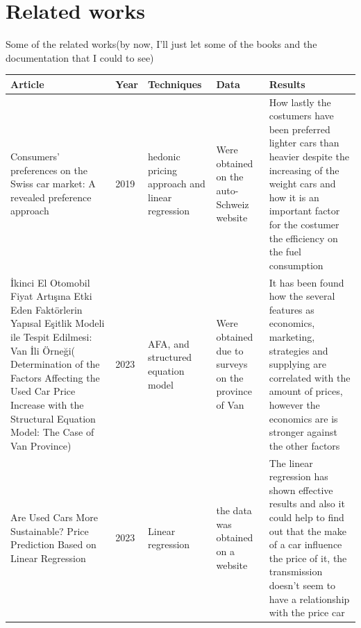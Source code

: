 \documentclass{article}
\begin{document}
\section{Related works}
Some of the related works(by now, I'll just let some of the books and the documentation that I could  to see)
\begin{center}
  \begin{tabular}{|m{2.5cm}|m{2.5cm}|m{2.5cm}|m{2.5cm}|m{2.5cm}|}
    \hline
    Article & Year & Techniques & Data & Results \\ \hline
    Consumers' preferences on the Swiss car market: A revealed preference approach& 2019&hedonic pricing approach and linear regression& Were obtained on the auto-Schweiz website&How lastly the costumers have been preferred lighter cars than heavier despite the increasing of the weight cars and how it is an important factor for the costumer the efficiency on the fuel consumption\\
    \hline
    İkinci El Otomobil Fiyat Artışına Etki Eden Faktörlerin Yapısal Eşitlik Modeli ile Tespit Edilmesi: Van İli Örneği( Determination of the Factors Affecting the Used Car Price Increase with the Structural Equation Model: The Case of Van Province) & 2023 & AFA, and structured equation model& Were obtained due to surveys on the province of Van & It has been found how the several features as economics, marketing, strategies and supplying are correlated with the amount of prices, however the economics are is stronger against the other factors\\
    \hline
    Are Used Cars More Sustainable? Price Prediction Based on Linear Regression&2023&Linear regression&the data was obtained on a website &The linear regression has shown effective results and also it could help to find out that the make of a car influence the price of it, the transmission doesn't seem to have a relationship with the price car\\
    \hline
  \end{tabular}
\end{center}
\end{document}
